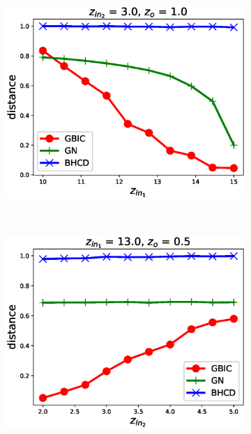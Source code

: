\begin{figure}
	\centering
	\begin{subfigure}{0.33\textwidth}
		\includegraphics[width=\textwidth]{pic/z_in_1.eps}
		\caption{}
	\end{subfigure}~
	\begin{subfigure}{0.33\textwidth}
		\includegraphics[width=\textwidth]{pic/z_in_2.eps}
		\caption{}
	\end{subfigure}~
	\begin{subfigure}{0.33\textwidth}

\end{subfigure}
\end{figure}

